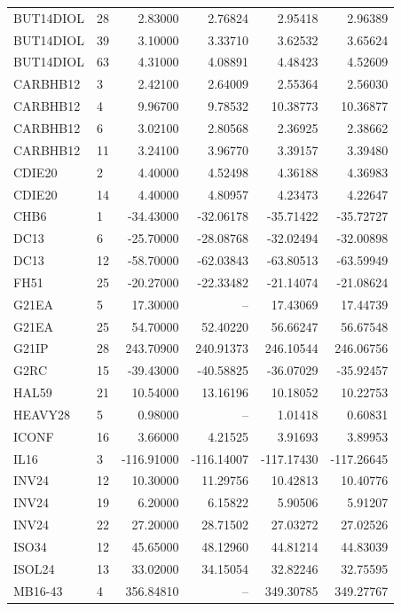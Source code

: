 {\begin{longtable}{llrrrr}
BUT14DIOL & 28 & 2.83000 & 2.76824 & 2.95418 & 2.96389 \\
BUT14DIOL & 39 & 3.10000 & 3.33710 & 3.62532 & 3.65624 \\
BUT14DIOL & 63 & 4.31000 & 4.08891 & 4.48423 & 4.52609 \\
CARBHB12 & 3 & 2.42100 & 2.64009 & 2.55364 & 2.56030 \\
CARBHB12 & 4 & 9.96700 & 9.78532 & 10.38773 & 10.36877 \\
CARBHB12 & 6 & 3.02100 & 2.80568 & 2.36925 & 2.38662 \\
CARBHB12 & 11 & 3.24100 & 3.96770 & 3.39157 & 3.39480 \\
CDIE20 & 2 & 4.40000 & 4.52498 & 4.36188 & 4.36983 \\
CDIE20 & 14 & 4.40000 & 4.80957 & 4.23473 & 4.22647 \\
CHB6 & 1 & -34.43000 & -32.06178 & -35.71422 & -35.72727 \\
DC13 & 6 & -25.70000 & -28.08768 & -32.02494 & -32.00898 \\
DC13 & 12 & -58.70000 & -62.03843 & -63.80513 & -63.59949 \\
FH51 & 25 & -20.27000 & -22.33482 & -21.14074 & -21.08624 \\
G21EA & 5 & 17.30000 & -- & 17.43069 & 17.44739 \\
G21EA & 25 & 54.70000 & 52.40220 & 56.66247 & 56.67548 \\
G21IP & 28 & 243.70900 & 240.91373 & 246.10544 & 246.06756 \\
G2RC & 15 & -39.43000 & -40.58825 & -36.07029 & -35.92457 \\
HAL59 & 21 & 10.54000 & 13.16196 & 10.18052 & 10.22753 \\
HEAVY28 & 5 & 0.98000 & -- & 1.01418 & 0.60831 \\
ICONF & 16 & 3.66000 & 4.21525 & 3.91693 & 3.89953 \\
IL16 & 3 & -116.91000 & -116.14007 & -117.17430 & -117.26645 \\
INV24 & 12 & 10.30000 & 11.29756 & 10.42813 & 10.40776 \\
INV24 & 19 & 6.20000 & 6.15822 & 5.90506 & 5.91207 \\
INV24 & 22 & 27.20000 & 28.71502 & 27.03272 & 27.02526 \\
ISO34 & 12 & 45.65000 & 48.12960 & 44.81214 & 44.83039 \\
ISOL24 & 13 & 33.02000 & 34.15054 & 32.82246 & 32.75595 \\
MB16-43 & 4 & 356.84810 & -- & 349.30785 & 349.27767 \\

\end{longtable}}
